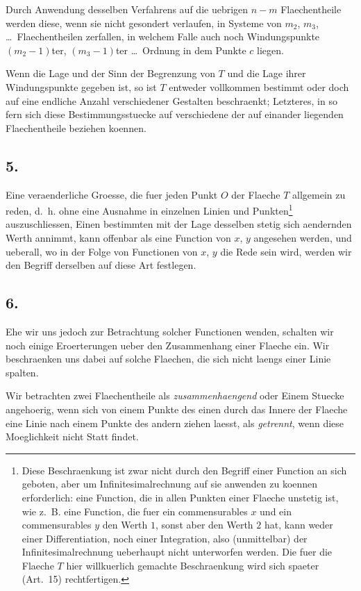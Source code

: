 \documentclass[11pt,a4paper]{article}
\theoremstyle{plain}
\theoremstyle{definition}
\begin{document}
Durch Anwendung desselben Verfahrens auf die uebrigen $n - m$ Flaechentheile werden diese, wenn sie nicht gesondert verlaufen, in Systeme von $m_2$, $m_3$, \dots\ Flaechentheilen zerfallen, in welchem Falle auch noch Windungspunkte $(m_2 - 1)$ter, $(m_3 - 1)$ter \dots\ Ordnung in dem Punkte $c$ liegen.

Wenn die Lage und der Sinn der Begrenzung von $T$ und die Lage ihrer Windungspunkte gegeben ist, so ist $T$ entweder vollkommen bestimmt oder doch auf eine endliche Anzahl verschiedener Gestalten beschraenkt; Letzteres, in so fern sich diese Bestimmungsstuecke auf verschiedene der auf einander liegenden Flaechentheile beziehen koennen.

\subsection*{5.}

Eine veraenderliche Groesse, die fuer jeden Punkt $O$ der Flaeche $T$ allgemein zu reden, d.\ h. ohne eine Ausnahme in einzelnen Linien und Punkten\footnote{Diese Beschraenkung ist zwar nicht durch den Begriff einer Function an sich geboten, aber um Infinitesimalrechnung auf sie anwenden zu koennen erforderlich: eine Function, die in allen Punkten einer Flaeche unstetig ist, wie z.\ B. eine Function, die fuer ein commensurables $x$ und ein commensurables $y$ den Werth $1$, sonst aber den Werth $2$ hat, kann weder einer Differentiation, noch einer Integration, also (unmittelbar) der Infinitesimalrechnung ueberhaupt nicht unterworfen werden. Die fuer die Flaeche $T$ hier willkuerlich gemachte Beschraenkung wird sich spaeter (Art.\ 15) rechtfertigen.} auszuschliessen, Einen bestimmten mit der Lage desselben stetig sich aendernden Werth annimmt, kann offenbar als eine Function von $x$, $y$ angesehen werden, und ueberall, wo in der Folge von Functionen von $x$, $y$ die Rede sein wird, werden wir den Begriff derselben auf diese Art festlegen.

\subsection*{6.}

Ehe wir uns jedoch zur Betrachtung solcher Functionen wenden, schalten wir noch einige Eroerterungen ueber den Zusammenhang einer Flaeche ein. Wir beschraenken uns dabei auf solche Flaechen, die sich nicht laengs einer Linie spalten.

Wir betrachten zwei Flaechentheile als \emph{zusammenhaengend} oder Einem Stuecke angehoerig, wenn sich von einem Punkte des einen durch das Innere der Flaeche eine Linie nach einem Punkte des andern ziehen laesst, als \emph{getrennt}, wenn diese Moeglichkeit nicht Statt findet.
\end{document}
